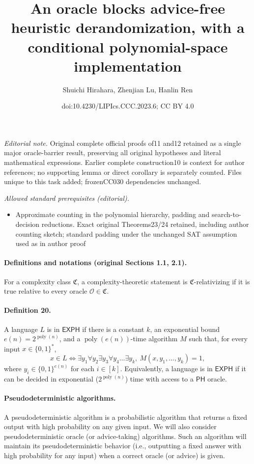 \documentclass[10pt,a4paper]{article}
\title{An oracle blocks advice-free heuristic derandomization, with a conditional polynomial-space implementation}
\author{Shuichi Hirahara, Zhenjian Lu, Hanlin Ren}
\date{doi:10.4230/LIPIcs.CCC.2023.6; CC BY 4.0}
\begin{document}
\maketitle
\noindent\textit{Editorial note.} Original complete official proofs of11 and12 retained as a single major oracle-barrier result, preserving all original hypotheses and literal mathematical expressions. Earlier complete construction10 is context for author references; no supporting lemma or direct corollary is separately counted. Files unique to this task added; frozenCC030 dependencies unchanged.\par\medskip
\noindent\textit{Allowed standard prerequisites (editorial).}\begin{itemize}
\item Approximate counting in the polynomial hierarchy, padding and search-to-decision reductions. Exact original Theorems23/24 retained, including author counting sketch; standard padding under the unchanged SAT assumption used as in author proof
\end{itemize}\medskip
\paragraph{Definitions and notations (original Sections 1.1, 2.1).}
For a complexity class $\mathfrak C$, a complexity-theoretic statement is $\mathfrak C$-relativizing if it is true relative to every oracle $\mathcal O\in\mathfrak C$.
\paragraph{Definition 20.} A language $L$ is in $\mathsf{EXPH}$ if there is a constant $k$, an exponential bound $e(n)=2^{\operatorname{poly}(n)}$, and a $\operatorname{poly}(e(n))$-time algorithm $M$ such that, for every input $x\in\{0,1\}^*$,
\[x\in L\Longleftrightarrow\exists y_1\forall y_2\exists y_3\forall y_4\ldots\exists y_k,\ M(x,y_1,\ldots,y_k)=1,\]
where $y_i\in\{0,1\}^{e(n)}$ for each $i\in[k]$. Equivalently, a language is in $\mathsf{EXPH}$ if it can be decided in exponential ($2^{\operatorname{poly}(n)}$) time with access to a $\mathsf{PH}$ oracle.
\paragraph{Pseudodeterministic algorithms.} A pseudodeterministic algorithm is a probabilistic algorithm that returns a fixed output with high probability on any given input. We will also consider pseudodeterministic oracle (or advice-taking) algorithms. Such an algorithm will maintain its pseudodeterministic behavior (i.e., outputting a fixed answer with high probability for any input) when a correct oracle (or advice) is given.
\end{document}
